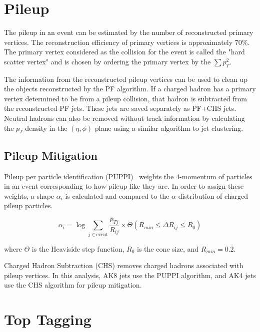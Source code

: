 \section{Pileup}

The pileup in an event can be estimated by the number of reconstructed primary vertices. The reconstruction efficiency of primary vertices is approximately 70\%. The primary vertex considered as the collision for the event is called the "hard scatter vertex" and is chosen by ordering the primary vertex by the $\sum p_{T}^2$.

The information from the reconstructed pileup vertices can be used to clean up the objects reconstructed by the PF algorithm. If a charged hadron has a primary vertex determined to be from a pileup collision, that hadron is subtracted from the reconstructed PF jets. These jets are saved separately as PF+CHS jets. Neutral hadrons can also be removed without track information by calculating the $p_T$ density in the $( \eta, \phi )$ plane using a similar algorithm to jet clustering.






\subsection*{Pileup Mitigation}

Pileup per particle identification (PUPPI)~\cite{puppi} weights the 4-momentum of particles in an event corresponding to how pileup-like they are. In order to assign these weights, a shape $\alpha_i$ is calculated and compared to the $\alpha$ distribution of charged pileup particles.

\begin{equation}
	\alpha_i = \log \sum_{j \in \text{event}} \frac{p_{Tj}}{R_{ij}} \times \Theta \left( R_{min} \leq \Delta R_{ij} \leq R_0  \right)
\end{equation}

where $\Theta$ is the Heaviside step function, $R_0$ is the cone size, and $R_{min} = 0.2$.


Charged Hadron Subtraction (CHS) removes charged hadrons associated with pileup vertices. In this analysis, AK8 jets use the PUPPI algorithm, and AK4 jets use the CHS algorithm for pileup mitigation.



\section{Top Tagging}
\label{sec:toptagging}

